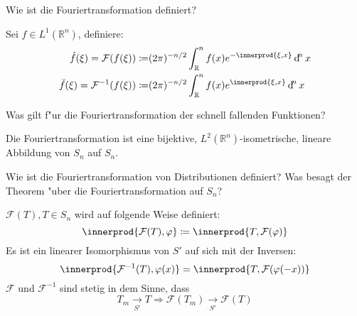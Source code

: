 \documentclass[9pt]{article}
\newcommand{\Rn}{\mathbb{R}^n}
\DeclarePairedDelimiter{\innerprod}\langle\rangle
\newenvironment{field}{}{\newpage}
\newif\ifnote
\newenvironment{note}{\notetrue}{\notefalse}
\newcommand{\localtag}{}
\newcommand{\globaltag}{}
\newcommand{\uuid}{}
\newcommand{\tags}[1]{
    \ifnote 
        \renewcommand{\localtag}{#1}
    \else
        \renewcommand{\globaltag}{#1}
    \fi 
    }
\newcommand{\xplain}[1]{\renewcommand{\uuid}{#1}}
\begin{document}
		\begin{note}
			\xplain{485b40ca-ec84-4d95-a49b-4735b461a33f}
			\tags{}
			
			\begin{field}  %
				Wie ist die Fouriertransformation definiert?
			\end{field}
			
			\begin{field}  %
				Sei $f\in L^1(\Rn)$, definiere:
				\begin{align*}
					\hat{f}(\xi) = \mathcal{F}(f(\xi)) \coloneqq& (2\pi)^{-n/2} \int_\Rn f(x) e^{-\innerprod{\xi,x}} \dif^n x\\
					\breve{f}(\xi) = \mathcal{F}^{-1}(f(\xi)) \coloneqq& (2\pi)^{-n/2} \int_\Rn f(x) e^{\innerprod{\xi,x}} \dif^n x
				\end{align*} 
			\end{field}
			
		\begin{field}  %
			Was gilt f"ur die Fouriertransformation der schnell fallenden Funktionen?
		\end{field}
		
		\begin{field}  %
			Die Fouriertransformation ist eine bijektive, $L^2(\Rn)$-isometrische, lineare Abbildung von $S_n$ auf $S_n$.
		\end{field}
			
		\begin{field}  %
			Wie ist die Fouriertransformation von Distributionen definiert? Was besagt der Theorem "uber die Fouriertransformation auf $S_n$?
		\end{field}

		\begin{field}  %
					 	$\mathcal{F}(T), T\in S_n$ wird auf folgende Weise definiert:
			\begin{equation*}
			\innerprod{\mathcal{F}(T), \varphi} \coloneqq \innerprod{T, \mathcal{F}(\varphi)}
			\end{equation*}
			Es ist ein linearer Isomorphismus von $S'$ auf sich mit der Inversen:
			\begin{equation*}
			\innerprod{\mathcal{F}^{-1}(T), \varphi(x)} = \innerprod{T, \mathcal{F}(\varphi(-x))}
			\end{equation*}
			$\mathcal{F}$ und $\mathcal{F}^{-1}$ sind stetig in dem Sinne, dass
			\begin{equation*}
			T_m \underset{S'}{\rightarrow} T \Rightarrow \mathcal{F}(T_m) 
			\underset{S'}{\rightarrow} \mathcal{F}(T)
			\end{equation*}
		\end{field}
			

\end{note}
\end{document}
